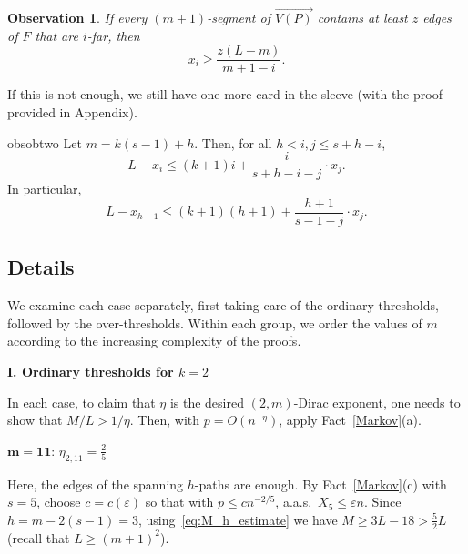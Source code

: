 \documentclass[reqno, 12pt]{amsart}
\numberwithin{equation}{section}
\numberwithin{figure}{section}
\let\epsilon=\varepsilon
\let\eps=\epsilon
\theoremstyle{plain}
\newtheorem{obs}[thm]{Observation}
\theoremstyle{definition}
\begin{document}
\begin{obs}\label{ob} If every $(m+1)$-segment of $\overrightarrow{V(P)}$ contains at least $z$ edges of $F$ that are $i$-far, then
\begin{equation}\label{eq:no_of_i_far_edges}
    x_i \geq \frac{z(L-m)}{m+1-i}.
\end{equation}

\end{obs}

If this is not enough, we still have one more card in the sleeve (with the proof provided in Appendix).



\begin{restatable}[]{obs}{obtwo}
\label{ob2}
Let $m= k(s-1)+h$.
Then, for all $h<i,j\le s+h-i$,
\begin{equation*}%
L-x_i\le(k+1)i+\frac{i}{s+h-i-j}\cdot x_j.
\end{equation*}
In particular,
\begin{equation}\label{eq:no_of_h+1_and_j_far_edges}
L-x_{h+1}\le(k+1)(h+1)+\frac{h+1}{s-1-j}\cdot x_j.
\end{equation}
\end{restatable}



\subsection{Details}

We examine each case separately, first taking care of the ordinary thresholds, followed by the over-thresholds. Within each group, we order the values of $m$ according to the increasing complexity of the proofs.

\medskip

{\bf I. Ordinary thresholds for $k=2$}

\medskip

In each case, to claim that $\eta$ is the desired $(2,m)$-Dirac exponent, one needs to show that $M/L > 1/\eta$. Then, with $p=O(n^{-\eta})$,   apply Fact~\ref{Markov}(a).

\medskip
	
$\mathbf{m=11}$:  $\eta_{2,11}= \frac25$

\medskip

Here, the edges of the spanning $h$-paths are enough. By Fact~\ref{Markov}(c) with $s=5$, choose $c=c(\eps)$ so that with $p\le cn^{-2/5}$, a.a.s.~$X_5\le \eps n$.  Since $h=m-2(s-1)=3$, using~\eqref{eq:M_h_estimate} we have $M\ge 3L-18>\frac52L$ (recall that $L\ge(m+1)^2$).
\end{document}
